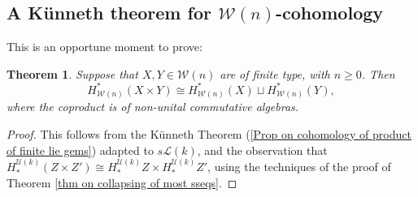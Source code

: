 \documentclass[11pt]{amsart} \renewcommand{\baselinestretch}{1.4}
\theoremstyle{plain}
\newtheorem{thm}{Theorem}[section]
\theoremstyle{definition}
\newcommand{\calU}{\mathcal{U}}
\newcommand{\calL}{\mathcal{L}}
\newcommand{\calw}{\mathcal{W}}
\newcommand{\calu}{\mathcal{U}}
\newcommand{\call}{\mathcal{L}}
\begin{document}
\begin{Calculations of HWn for n nonzero}
\subsection{A K\"unneth theorem for $\calw(n)$-cohomology}
This is an opportune moment to prove:
\begin{thm}
\label{Koszul-dual Hilton-Milnor theorem}
Suppose that $X,Y\in\calw(n)$ are  of finite type, with $n\geq0$. Then 
\[H^*_{\calw(n)}(X\times Y)\cong H^*_{\calw(n)}(X)\sqcup H^*_{\calw(n)}(Y),\]
where the coproduct is of non-unital commutative algebras.
\end{thm}
\begin{proof}
This follows from the K\"unneth Theorem (\ref{Prop on cohomology of product of finite lie gems}) adapted to $s\call(k)$, and the observation that $H_*^{\calu(k)}(Z\times Z')\cong H_*^{\calu(k)}Z\times H_*^{\calu(k)}Z'$,
using the techniques of the proof of Theorem \ref{thm on collapsing of most sseqs}.
\end{proof}


\end{Calculations of HWn for n nonzero}
\end{document}
